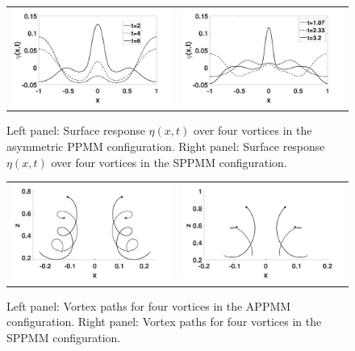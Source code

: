 \documentclass[a4paper,11pt]{article}
\begin{document}
\begin{figure}[!h]
\centering
\begin{tabular}{cc}
\includegraphics[width=.5\textwidth]{surf_resp_mu_pt2_F_pt2_ppmm} & 
\includegraphics[width=.5\textwidth]{surf_resp_mu_pt2_F_pt2_ppmm_sym}
\end{tabular}
\caption{\small Left panel: Surface response $\eta(x,t)$ over four vortices in the asymmetric PPMM configuration.
Right panel: Surface response $\eta(x,t)$ over four vortices in the SPPMM configuration.}
\label{fig:surfrepppmm}
\end{figure}
%
\begin{figure}[!h]
\centering
\begin{tabular}{cc}
\includegraphics[width=.5\textwidth]{tracks_F_pt2_tf_6_ppmm} & 
\includegraphics[width=.5\textwidth]{tracks_F_pt2_tf_3pt2_ppmm_sym}
\end{tabular}
\caption{\small Left panel: Vortex paths for four vortices in the APPMM configuration.
Right panel: Vortex paths for four vortices in the SPPMM configuration.}
\label{fig:tracksppmm}
\end{figure}
\end{document}
